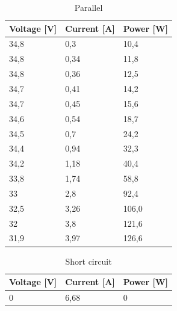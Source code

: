 \documentclass[12pt]{article}
\begin{document}
\begin{table}[!h]
	\centering
	\begin{tabular}{|p{2cm}|p{2cm}|p{2cm}|}
		\hline
		\rowcolor{RedOrange!80} Voltage [V] & Current [A] & Power [W] \\
		\hline
		\rowcolor{Peach!70}       34,8      & 0,3         & 10,4      \\
		\hline
		\rowcolor{Melon!70}        34,8     & 0,34        & 11,8      \\
		\hline
		\rowcolor{Peach!70}         34,8    & 0,36        & 12,5      \\
		\hline
		\rowcolor{Melon!70}        34,7     & 0,41        & 14,2      \\
		\hline
		\rowcolor{Peach!70}        34,7     & 0,45        & 15,6      \\
		\hline
		\rowcolor{Melon!70}          34,6   & 0,54        & 18,7      \\
		\hline
		\rowcolor{Peach!70}         34,5    & 0,7         & 24,2      \\
		\hline
		\rowcolor{Melon!70}          34,4   & 0,94        & 32,3      \\
		\hline
		\rowcolor{Peach!70}           34,2  & 1,18        & 40,4      \\
		\hline
		\rowcolor{Melon!70}         33,8    & 1,74        & 58,8      \\
		\hline
		\rowcolor{Peach!70}           33    & 2,8         & 92,4      \\
		\hline
		\rowcolor{Melon!70}           32,5  & 3,26        & 106,0     \\
		\hline
		\rowcolor{Peach!70}           32    & 3,8         & 121,6     \\
		\hline
		\rowcolor{Melon!70}           31,9  & 3,97        & 126,6     \\
		\hline
	\end{tabular}
	\caption{Parallel}
	\label{tab:my_label}
\end{table}

\begin{table}[!h]
	\centering
	\begin{tabular}{|p{2cm}|p{2cm}|p{2cm}|}
		\hline
		\rowcolor{Red!80} Voltage [V] & Current [A] & Power [W] \\
		\hline
		\rowcolor{Red!60} 0           & 6,68        & 0         \\
		\hline
	\end{tabular}
	\caption{Short circuit}
	\label{tab:my_label}
\end{table}
\newpage
\FloatBarrier
\end{document}
